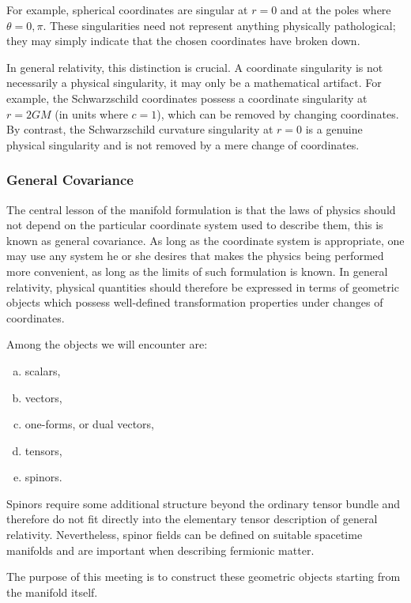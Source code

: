 		For example, spherical coordinates are singular at $r=0$ and at the
		poles where $\theta=0,\pi$. These singularities need not represent
		anything physically pathological; they may simply indicate that the
		chosen coordinates have broken down.

		In general relativity, this distinction is crucial. A coordinate
		singularity is not necessarily a physical singularity, it may only be 
		a mathematical artifact. For example,
		the Schwarzschild coordinates possess a coordinate singularity at
		$r=2GM$ (in units where $c=1$), which can be removed by changing
		coordinates. By contrast, the Schwarzschild curvature singularity
		at $r=0$ is a genuine physical singularity and is not removed by a
		mere change of coordinates.

	\subsubsection{General Covariance}

		The central lesson of the manifold formulation is that the laws of
		physics should not depend on the particular coordinate system used
		to describe them, this is known as general covariance. As long as the coordinate system is appropriate, one
		may use any system he or she desires that makes the physics being
		performed more convenient, as long as the limits of such formulation is known.
		In general relativity, physical quantities should therefore be
		expressed in terms of geometric objects which possess well-defined
		transformation properties under changes of coordinates.

		Among the objects we will encounter are:
		\begin{enumerate}[(a)]
		\item scalars,
		\item vectors,
		\item one-forms, or dual vectors,
		\item tensors,
		\item spinors.
		\end{enumerate}

		Spinors require some additional structure beyond the ordinary tensor
		bundle and therefore do not fit directly into the elementary tensor
		description of general relativity. Nevertheless, spinor fields can
		be defined on suitable spacetime manifolds and are important when
		describing fermionic matter.

		The purpose of this meeting is to construct these geometric objects
		starting from the manifold itself.

